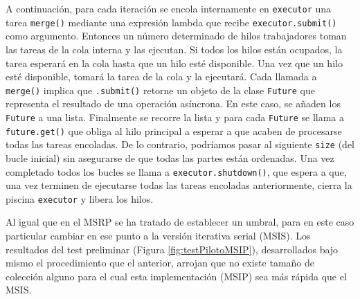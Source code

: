 \documentclass[titlepage]{article}
\begin{document}
A continuación, para cada iteración se encola internamente en \lstinline|executor| una tarea \lstinline|merge()| mediante una expresión lambda que recibe \lstinline|executor.submit()| como argumento. Entonces un número determinado de hilos trabajadores toman las tareas de la cola interna y las ejecutan. Si todos los hilos están ocupados, la tarea esperará en la cola hasta que un hilo esté disponible. Una vez que un hilo esté disponible, tomará la tarea de la cola y la ejecutará. Cada llamada a \lstinline|merge()| implica que \lstinline|.submit()| retorne un objeto de la clase \lstinline|Future| que representa el resultado de una operación asíncrona. En este caso, se añaden los \lstinline|Future| a una lista. Finalmente se recorre la lista y para cada \lstinline|Future| se llama a \lstinline|future.get()| que obliga al hilo principal a esperar a que acaben de procesarse todas las tareas encoladas. De lo contrario, podríamos pasar al siguiente \lstinline|size| (del bucle inicial) sin asegurarse de que todas las partes están ordenadas. Una vez completado todos los bucles se llama a \lstinline|executor.shutdown()|, que espera a que, una vez terminen de ejecutarse todas las tareas encoladas anteriormente, cierra la piscina \lstinline|executor| y libera los hilos.

Al igual que en el MSRP se ha tratado de establecer un umbral, para en este caso particular cambiar en ese punto a la versión iterativa serial (MSIS). Los resultados del test preliminar (Figura \ref{fig:testPilotoMSIP}), desarrollados bajo mismo el procedimiento que el anterior, arrojan que no existe tamaño de colección alguno para el cual esta implementación (MSIP) sea más rápida que el MSIS.
\end{document}
